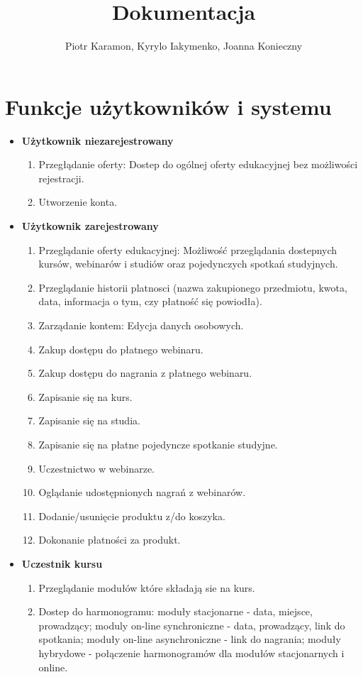 \documentclass[11pt]{article}
\author{Piotr Karamon, Kyrylo Iakymenko, Joanna Konieczny}
\date{}
\title{Dokumentacja}
\begin{document}
\maketitle
\tableofcontents

\section{Funkcje użytkowników i systemu}
\label{sec:org9c849e4}
\begin{itemize}
\item \textbf{Użytkownik niezarejestrowany}
\begin{enumerate}
\item Przegłądanie oferty: Dostep do ogólnej oferty edukacyjnej bez możliwości rejestracji.
\item Utworzenie konta.
\end{enumerate}
\item \textbf{Użytkownik zarejestrowany}
\begin{enumerate}
\item Przeglądanie oferty edukacyjnej: Możliwość przeglądania dostepnych kursów, webinarów i studiów oraz pojedynczych spotkań studyjnych.
\item Przeglądanie historii platnosci (nazwa zakupionego przedmiotu, kwota, data, informacja o tym, czy płatność się powiodła).
\item Zarządanie kontem: Edycja danych osobowych.
\item Zakup dostępu do płatnego webinaru.
\item Zakup dostępu do nagrania z płatnego webinaru.
\item Zapisanie się na kurs.
\item Zapisanie się na studia.
\item Zapisanie się na płatne pojedyncze spotkanie studyjne.
\item Uczestnictwo w webinarze.
\item Oglądanie udostępnionych nagrań z webinarów.
\item Dodanie/usunięcie produktu z/do koszyka.
\item Dokonanie płatności za produkt.
\end{enumerate}
\item \textbf{Uczestnik kursu}
\begin{enumerate}
\item Przeglądanie modułów które składają sie na kurs.
\item Dostep do harmonogramu: moduły stacjonarne - data, miejsce, prowadzący; moduly on-line synchroniczne - data, prowadzący, link do spotkania; moduły on-line asynchroniczne - link do nagrania; moduły hybrydowe - połączenie harmonogramów dla modułów stacjonarnych i online.

\end{enumerate}
\end{itemize}
\end{document}
